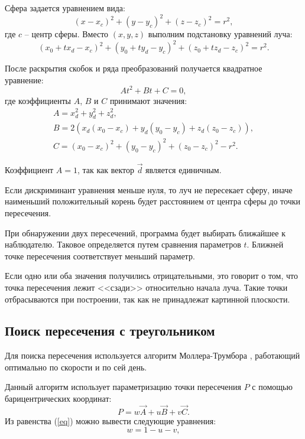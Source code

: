 Сфера задается уравнением вида:
\begin{equation}
	(x - x_c)^2 + (y - y_c)^2 + (z - z_c)^2 = r^2,
\end{equation}
где $c$ -- центр сферы. Вместо $(x, y, z)$ выполним подстановку уравнений луча:
\begin{equation}
	(x_0 + tx_d - x_c)^2 + (y_0 + ty_d - y_c)^2 + (z_0 + tz_d - z_c)^2 = r^2.
\end{equation}

После раскрытия скобок и ряда преобразований получается квадратное уравнение:
\begin{equation}
	At^2 + Bt + C = 0,
\end{equation}
где коэффициенты $A$, $B$ и $C$ принимают значения:
\begin{eqnarray}
	A = x_d^2 + y_d^2 + z_d^2,\\
	B = 2(x_d(x_0 - x_c) + y_d(y_0 - y_c) + z_d(z_0 - z_c)),\\
	C = (x_0 - x_c)^2 + (y_0 - y_c)^2 + (z_0 - z_c)^2 - r^2.
\end{eqnarray}

Коэффициент $A = 1$, так как вектор $\vec{d}$ является единичным.

Если дискриминант уравнения меньше нуля, то луч не пересекает сферу, иначе наименьший положительный корень будет расстоянием от центра сферы до точки пересечения.

При обнаружении двух пересечений, программа будет выбирать ближайшее к наблюдателю. Таковое определяется путем сравнения параметров $t$. Ближней точке пересечения соответствует меньший параметр.

Если одно или оба значения получились отрицательными, это говорит о том, что точка пересечения лежит <<сзади>> относительно начала луча. Такие точки отбрасываются при построении, так как не принадлежат картинной плоскости.

\subsection{Поиск пересечения с треугольником}

Для поиска пересечения используется алгоритм Моллера-Трумбора \cite{trumbor}, работающий оптимально по скорости и по сей день.

Данный алгоритм использует параметризацию точки пересечения $P$ с помощью барицентрических координат:
\begin{equation}
	P = w\vec{A} + u\vec{B} + v\vec{C}.
\end{equation}
Из равенства (\ref{eq}) можно вывести следующие уравнения:
\begin{equation}\label{eq}
	w = 1 - u - v,
\end{equation}

